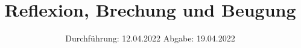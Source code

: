 

\subject{V400}
\title{Reflexion, Brechung und Beugung}
\date{%
  Durchführung: 12.04.2022
  \hspace{3em}
  Abgabe: 19.04.2022
}



\maketitle
\thispagestyle{empty}
\tableofcontents
\newpage







\printbibliography{}


